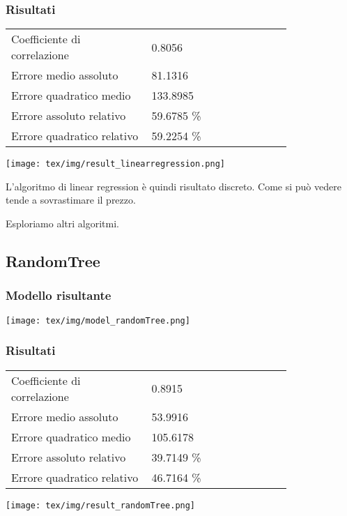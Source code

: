\documentclass[12pt]{report}
\begin{document}
\newpage
\subsubsection{Risultati}
\begin{table}[ht]
	\centering
	\begin{tabular}{p{0.4\linewidth}p{0.4\linewidth}}
		Coefficiente di correlazione & 0.8056     \\
		Errore medio assoluto        & 81.1316    \\
		Errore quadratico medio      & 133.8985   \\
		Errore assoluto relativo     & 59.6785 \% \\
		Errore quadratico relativo   & 59.2254 \% \\
	\end{tabular}
\end{table}

\texttt{[image: tex/img/result\_linearregression.png]}

L'algoritmo di linear regression è quindi risultato discreto. Come si può vedere tende a sovrastimare
il prezzo.

Esploriamo altri algoritmi.

\newpage
\subsection{RandomTree}

\subsubsection{Modello risultante}
\texttt{[image: tex/img/model\_randomTree.png]}

\newpage
\subsubsection{Risultati}
\begin{table}[ht]
	\centering
	\begin{tabular}{p{0.4\linewidth}p{0.4\linewidth}}
		Coefficiente di correlazione & 0.8915     \\
		Errore medio assoluto        & 53.9916    \\
		Errore quadratico medio      & 105.6178   \\
		Errore assoluto relativo     & 39.7149 \% \\
		Errore quadratico relativo   & 46.7164 \% \\
	\end{tabular}
\end{table}
\texttt{[image: tex/img/result\_randomTree.png]}
\end{document}
